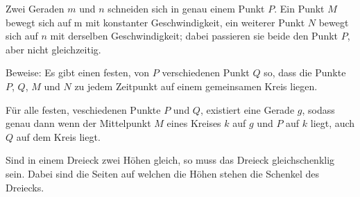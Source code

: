 \documentclass[10pt, a4paper]{amsart}
\begin{document}
\newpage
\begin{aufgabe}
  Zwei Geraden $m$ und $n$ schneiden sich in genau einem Punkt $P$. Ein Punkt
  $M$ bewegt sich auf m mit konstanter Geschwindigkeit, ein weiterer Punkt $N$
  bewegt sich auf $n$ mit derselben Geschwindigkeit; dabei passieren sie beide
  den Punkt $P$, aber nicht gleichzeitig.
 
  Beweise: Es gibt einen festen, von $P$ verschiedenen Punkt $Q$ so, dass die
  Punkte
  $P$, $Q$, $M$ und $N$ zu jedem Zeitpunkt auf einem gemeinsamen Kreis liegen.\\
\end{aufgabe}
\begin{lemma}\label{sec3:lemma1}
  Für alle festen, veschiedenen Punkte $P$ und $Q$, existiert eine Gerade $g$, sodass
  genau dann wenn der Mittelpunkt $M$ eines Kreises $k$ auf $g$ und $P$ auf $k$
  liegt, auch $Q$ auf dem Kreis liegt.
\end{lemma}
\begin{lemma}\label{sec3:lemma2}
  Sind in einem Dreieck zwei Höhen gleich, so muss das Dreieck gleichschenklig
  sein. Dabei sind die Seiten auf welchen die Höhen stehen die Schenkel des
  Dreiecks.
\end{lemma}
\end{document}
